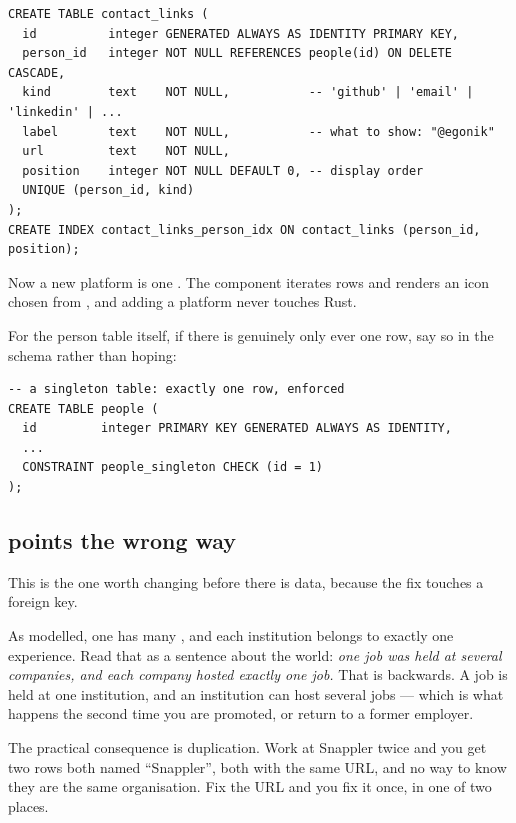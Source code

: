 \begin{pattern}
\begin{lstlisting}[style=sql]
CREATE TABLE contact_links (
  id          integer GENERATED ALWAYS AS IDENTITY PRIMARY KEY,
  person_id   integer NOT NULL REFERENCES people(id) ON DELETE CASCADE,
  kind        text    NOT NULL,           -- 'github' | 'email' | 'linkedin' | ...
  label       text    NOT NULL,           -- what to show: "@egonik"
  url         text    NOT NULL,
  position    integer NOT NULL DEFAULT 0, -- display order
  UNIQUE (person_id, kind)
);
CREATE INDEX contact_links_person_idx ON contact_links (person_id, position);
\end{lstlisting}
Now a new platform is one . The component iterates rows and renders an icon chosen
from , and adding a platform never touches Rust.
\end{pattern}

For the person table itself, if there is genuinely only ever one row, say so in the schema rather
than hoping:

\begin{lstlisting}[style=sql]
-- a singleton table: exactly one row, enforced
CREATE TABLE people (
  id         integer PRIMARY KEY GENERATED ALWAYS AS IDENTITY,
  ...
  CONSTRAINT people_singleton CHECK (id = 1)
);
\end{lstlisting}

\subsection{ points the wrong way}

This is the one worth changing before there is data, because the fix touches a foreign key.

As modelled, one  has many , and each institution
belongs to exactly one experience. Read that as a sentence about the world: \emph{one job was held
at several companies, and each company hosted exactly one job.} That is backwards. A job is held at
one institution, and an institution can host several jobs --- which is what happens the second time
you are promoted, or return to a former employer.

The practical consequence is duplication. Work at Snappler twice and you get two
 rows both named ``Snappler'', both with the same URL, and no way to know
they are the same organisation. Fix the URL and you fix it once, in one of two places.

